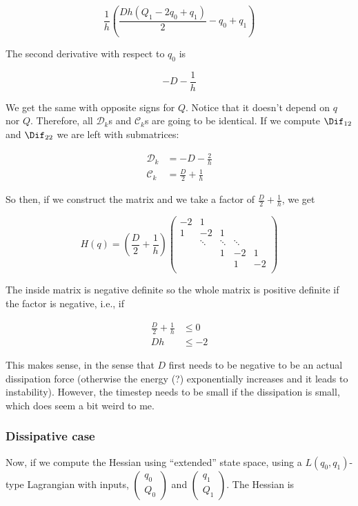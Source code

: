 \documentclass{article}
\begin{document}
\[
\frac{1}{h} \left(
\frac{D h \left(Q_{1} - 2 q_{0} + q_{1}\right)}{2} - q_{0} + q_{1}
\right)
\]

The second derivative with respect to $q_0$ is

\[
    - D - \frac{1}{h}
\]

We get the same with opposite signs for $Q$. Notice that it doesn't depend on $q$ nor $Q$. Therefore, all $\mathcal{D}_k$s and $\mathcal{C}_k$s are going to be identical. If we compute $\Dif_{12}$ and $\Dif_{22}$ we are left with submatrices:

\begin{align}    
    \mathcal{D}_k & = - D - \frac{2}{h} \\
    \mathcal{C}_k & = \frac{D}{2} + \frac{1}{h}
\end{align}

So then, if we construct the matrix and we take a factor of $\frac{D}{2} + \frac{1}{h}$, we get


\[
    H(q) = \left(\frac{D}{2}+ \frac{1}{h}\right) \begin{pmatrix}
        -2 & 1 \\
        1 & -2 & 1 \\
        & \ddots & \ddots & \ddots & \\
        & & 1 & -2 & 1 \\ 
        & & & 1 & -2 \\  
    \end{pmatrix}
\]

The inside matrix is negative definite so the whole matrix is positive definite if the factor is negative, i.e., if

\begin{align}
    \frac{D}{2} + \frac{1}{h} & \le 0 \\
    Dh & \le -2
\end{align}


This makes sense, in the sense that $D$ first needs to be negative to be an actual dissipation force (otherwise the energy (?) exponentially increases and it leads to instability). However, the timestep needs to be small if the dissipation is small, which does seem a bit weird to me.

\subsubsection{Dissipative case}

Now, if we compute the Hessian using ``extended'' state space, using a $L(q_0, q_1)$-type Lagrangian with inputs, $\begin{pmatrix} q_0 \\ Q_0 \end{pmatrix}$ and $\begin{pmatrix} q_1 \\ Q_1 \end{pmatrix}$. The Hessian is
\end{document}
